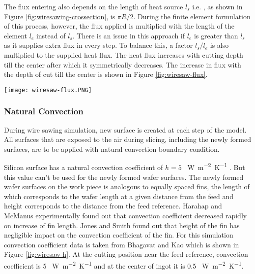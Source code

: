 The flux entering also depends on the length of heat source $l_{s}$ i.e. , as shown in Figure \ref{fig:wiresawing-crossection}, is $\pi R /2 $. During the finite element formulation of this process, however, the flux applied is multiplied with the length of the element $l_{e}$ instead of $l_{s}$. There is an issue in this approach if $l_{e}$ is greater than $l_{s}$ as it supplies extra flux in every step. To balance this, a factor $l_{s}/l_{e}$ is also multiplied to the supplied heat flux. The heat flux increases with cutting depth till the center after which it symmetrically decreases. The increase in flux with the depth of cut till the center is shown in Figure \ref{fig:wiresaw-flux}. 

\noindent
\begin{minipage}[c]{\textwidth}
\centering
        \captionsetup{type=figure}
        \texttt{[image: wiresaw-flux.PNG]}
        \label{fig:wiresaw-flux}
\end{minipage}

\subsubsection{Natural Convection}
During wire sawing simulation, new surface is created at each step of the model. All surfaces that are exposed to the air during slicing, including the newly formed surfaces, are to be applied with natural convection boundary condition. 

Silicon surface has a natural convection coefficient of $h = 5$ \SI{}{W.m^{-2}.K^{-1}} \cite{bhagavat2008finite}. But this value can’t be used for the newly formed wafer surfaces. The newly formed wafer surfaces on the work piece is analogous to equally spaced fins, the length of which corresponds to the wafer length at a given distance from the feed and height corresponds to the distance from the feed reference. Harahap and McManus \cite{harahap1967natural} experimentally found out that convection coefficient decreased rapidly on increase of fin length. Jones and Smith \cite{jones1970optimum} found out that height of the fin has negligible impact on the convection coefficient of the fin. For this simulation convection coefficient data is taken from Bhagavat and Kao \cite{bhagavat2008finite} which is shown in Figure \ref{fig:wiresaw-h}.  At the cutting position near the feed reference, convection coefficient is 5 \SI{}{W.m^{-2}.K^{-1}} and at the center of ingot it is 0.5 \SI{}{W.m^{-2}.K^{-1}}.

